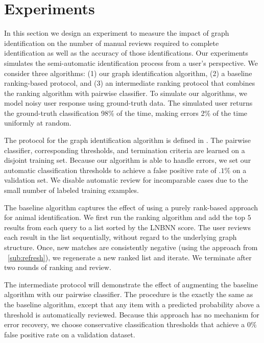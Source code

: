 \section{Experiments}\label{sec:graphexpt}
    In this section we design an experiment to measure the impact of graph identification on the number of manual
    reviews required to complete identification as well as the accuracy of those identifications. Our experiments
    simulates the semi-automatic identification process from a user's perspective. We consider three algorithms: (1) our
    graph identification algorithm, (2) a baseline ranking-based protocol, and (3) an intermediate ranking protocol that
    combines the ranking algorithm with pairwise classifier. To simulate our algorithms, we model noisy user response
    using ground-truth data. The simulated user returns the ground-truth classification 98\% of the
    time, making errors 2\% of the time uniformly at random.

    The protocol for the graph identification algorithm is defined in . The pairwise classifier,
    corresponding thresholds, and termination criteria are learned on a disjoint training set. Because our algorithm is
    able to handle errors, we set our automatic classification thresholds to achieve a false positive rate of $.1\%$ 
    on a validation set. We disable automatic review for incomparable cases due to the small number of labeled training
    examples.

    The baseline algorithm captures the effect of using a purely rank-based approach for animal identification. We first
    run the ranking algorithm and add the top $5$ results from each query to a list sorted by the LNBNN score. The user
    reviews each result in the list sequentially, without regard to the underlying graph structure. Once, new matches
    are consistently negative (using the approach from ~\cref{sub:refresh}), we regenerate a new ranked list and
    iterate. We terminate after two rounds of ranking and review.

    The intermediate protocol will demonstrate the effect of augmenting the baseline algorithm with our pairwise
    classifier. The procedure is the exactly the same as the baseline algorithm, except that any item with a predicted
    probability above a threshold is automatically reviewed. Because this approach has no mechanism for error recovery,
    we choose conservative classification thresholds that achieve a $0\%$ false 
    positive rate on a validation dataset.

